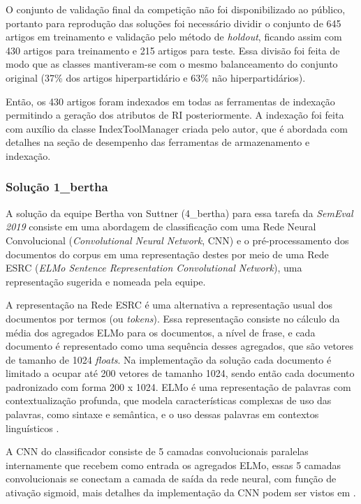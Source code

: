 			O conjunto de validação final da competição não foi disponibilizado ao público, portanto para reprodução das soluções foi necessário dividir o conjunto de 645 artigos em treinamento e validação pelo método de \textit{holdout}, ficando assim com 430 artigos para treinamento e 215 artigos para teste. 
			Essa divisão foi feita de modo que as classes mantiveram-se com o mesmo balanceamento do conjunto original (37\% dos artigos hiperpartidário e 63\% não hiperpartidários).

			Então, os 430 artigos foram indexados em todas as ferramentas de indexação permitindo a geração dos atributos de RI posteriormente.
			A indexação foi feita com auxílio da classe IndexToolManager criada pelo autor, que é abordada com detalhes na seção de desempenho das ferramentas de armazenamento e indexação.
			
			\subsubsection{Solução 1\_bertha}
				A solução da equipe Bertha von Suttner (4\_bertha) para essa tarefa da \textit{SemEval 2019} consiste em uma abordagem de classificação com uma Rede Neural Convolucional (\textit{Convolutional Neural Network}, CNN) e o pré-processamento dos documentos do corpus em uma representação destes por meio de uma Rede ESRC (\textit{ELMo Sentence Representation Convolutional Network}), uma representação sugerida e nomeada pela equipe.

				A representação na Rede ESRC é uma alternativa a representação usual dos documentos por termos (ou \textit{tokens}).
				Essa representação consiste no cálculo da média dos agregados ELMo para os documentos, a nível de frase, e cada documento é representado como uma sequência desses agregados, que são vetores de tamanho de 1024 \textit{floats}. 
				Na implementação da solução cada documento é limitado a ocupar até 200 vetores de tamanho 1024, sendo então cada documento padronizado com forma 200 x 1024.
				ELMo é uma representação de palavras com contextualização profunda, que modela características complexas de uso das palavras, como sintaxe e semântica, e o uso dessas palavras em contextos linguísticos \cite{ELMoDBLP:journals/corr/abs-1802-05365}.

				A CNN do classificador consiste de 5 camadas convolucionais paralelas internamente que recebem como entrada os agregados ELMo, essas 5 camadas convolucionais se conectam a camada de saída da rede neural, com função de ativação sigmoid, mais detalhes da implementação da CNN podem ser vistos em .

